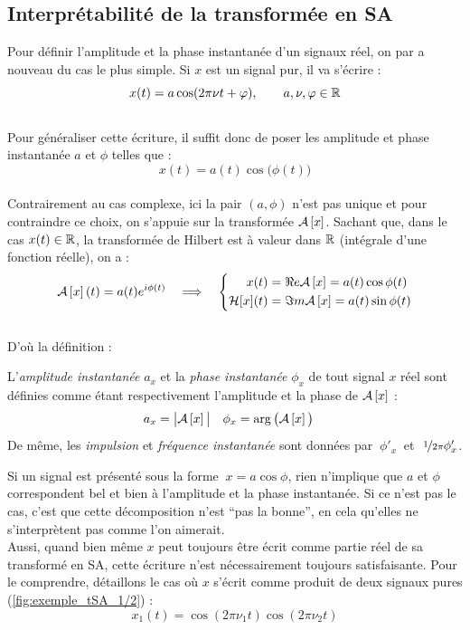 \subsection{Interprétabilité de la transformée en SA}\label{sec:Bedrisan&AM-FM}

Pour définir l'amplitude et la phase instantanée d'un signaux réel, on par a nouveau du cas le plus simple. Si $x$ est un signal pur, il va s'écrire :
\[x(t) = a \cos(2\pi\nu t + \varphi),\qquad a,\nu,\varphi\in\mathbb{R}\]
\\
Pour généraliser cette écriture, il suffit donc de poser les amplitude et phase instantanée $a$ et $\phi$ telles que :
\[x(t) = a(t) \cos\big( \phi(t) \big)\]
\\
Contrairement au cas complexe, ici la pair $(a,\phi)$ n'est pas unique et pour contraindre ce choix, on s'appuie sur la transformée $\mathcal{A}\left[x\right]$. Sachant que, dans le cas $x(t)\in\mathbb{R}$, la transformée de Hilbert est à valeur dans $\mathbb{R}$ (intégrale d'une fonction réelle), on a :
\[\mathcal{A}\left[x\right](t) = a(t)e^{i\phi(t)}\quad \Longrightarrow\quad \left\{\begin{aligned}x(t) &= \Re e \mathcal{A}\left[x\right] = a(t) \cos\phi(t) \\ \mathcal{H}[x](t) &= \Im m \mathcal{A}\left[x\right] = a(t) \sin\phi(t)
\end{aligned}\right.\]
\\
D'où la définition :
\begin{definition}\label{def:ampli-phase_instant}
	L'\emph{amplitude instantanée} $a_x$ et la \emph{phase instantanée} $\phi_x$ de tout signal $x$ réel sont définies comme étant respectivement l'amplitude et la phase de $\mathcal{A}\left[x\right]$ :
	\begin{align}\label{eq:ampli-phase_instant}
		a_x &= \big|\mathcal{A}\left[x\right]\big|   &   \phi_x &= \arg\big(\mathcal{A}\left[x\right]\big)
	\end{align}
	De même, les \emph{impulsion} et \emph{fréquence instantanée} sont données par $\ \phi'_x\ $ et $\ \nicefrac{1}{2\pi}\phi_x'$.
\end{definition}
\skipl

Si un signal est présenté sous la forme  $\ x=a\cos\phi$, rien n'implique que $a$ et $\phi$ correspondent bel et bien à l'amplitude et la phase instantanée. Si ce n'est pas le cas, c'est que cette décomposition n'est ``pas la bonne'', en cela qu'elles ne s’interprètent pas comme l'on aimerait.
\\
Aussi, quand bien même $x$ peut toujours être écrit comme partie réel de sa transformé en SA, cette écriture n'est nécessairement toujours satisfaisante. Pour le comprendre, détaillons le cas où $x$ s'écrit comme produit de deux signaux pures (\cref{fig:exemple_tSA_1/2}) :
\[x_1(t) = \cos (2\pi\nu_1t)\cos (2\pi\nu_2t)\]

